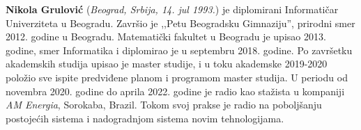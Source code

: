 \documentclass[12pt,oneside]{memoir}
\begin{document}
\literatura


\backmatter


\begin{biografija}
  \textbf{Nikola Grulović} (\emph{Beograd, Srbija,
    14. jul 1993.}) je diplomirani Informatičar Univerziteta u Beogradu. Završio je ,,Petu Beogradsku Gimnaziju'', prirodni smer 2012. godine u Beogradu. Matematički fakultet u Beogradu je upisao 2013. godine, smer Informatika i diplomirao je u septembru 2018. godine. Po završetku akademskih studija upisao je master studije, i u toku akademske 2019-2020 položio sve ispite predviđene planom i programom master studija. U periodu od novembra 2020. godine do aprila 2022. godine je radio kao stažista u kompaniji \textit{AM Energia}, Sorokaba, Brazil. Tokom svoj prakse je radio na poboljšanju postojećih sistema i nadogradnjom sistema novim tehnologijama.
\end{biografija}
\end{document}
